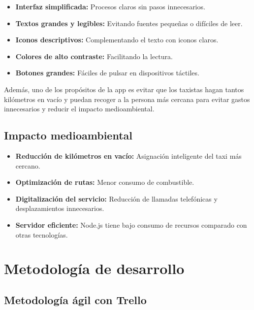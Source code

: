 \documentclass[12pt,a4paper]{article}
\begin{document}
\begin{itemize}
    \item \textbf{Interfaz simplificada:} Procesos claros sin pasos innecesarios.
    \item \textbf{Textos grandes y legibles:} Evitando fuentes pequeñas o difíciles de leer.
    \item \textbf{Iconos descriptivos:} Complementando el texto con iconos claros.
    \item \textbf{Colores de alto contraste:} Facilitando la lectura.
    \item \textbf{Botones grandes:} Fáciles de pulsar en dispositivos táctiles.
\end{itemize}

Además, uno de los propósitos de la app es evitar que los taxistas hagan tantos kilómetros en vacío y puedan recoger a la persona más cercana para evitar gastos innecesarios y reducir el impacto medioambiental.

\subsection{Impacto medioambiental}

\begin{itemize}
    \item \textbf{Reducción de kilómetros en vacío:} Asignación inteligente del taxi más cercano.
    \item \textbf{Optimización de rutas:} Menor consumo de combustible.
    \item \textbf{Digitalización del servicio:} Reducción de llamadas telefónicas y desplazamientos innecesarios.
    \item \textbf{Servidor eficiente:} Node.js tiene bajo consumo de recursos comparado con otras tecnologías.
\end{itemize}

\newpage

\section{Metodología de desarrollo}

\subsection{Metodología ágil con Trello}
\end{document}
